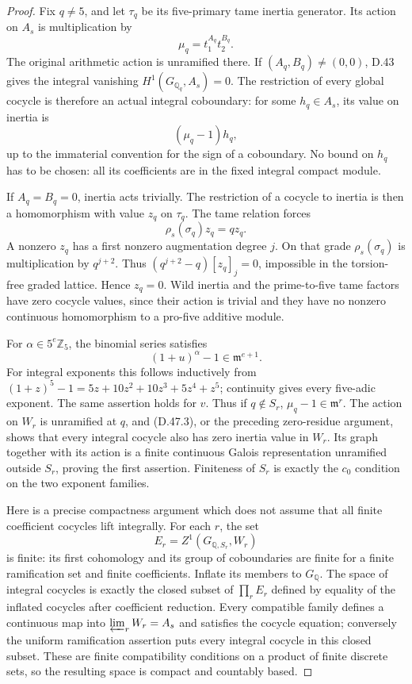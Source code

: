 \begin{proof}
Fix \(q\ne5\), and let \(\tau_q\) be its
five-primary tame inertia generator.
Its action on \(A_s\) is multiplication by
\[
                   \mu_q=t_1^{A_q}t_2^{B_q}.
\]
The original arithmetic action is unramified
there. If \((A_q,B_q)\ne(0,0)\), D.43 gives
the integral vanishing
\(H^1(G_{\mathbb Q_q},A_s)=0\).
The restriction of every global cocycle is
therefore an actual integral coboundary:
for some \(h_q\in A_s\), its value on inertia is
\[
                         (\mu_q-1)h_q,                        \tag{D.47.3}
\]
up to the immaterial convention for the
sign of a coboundary. No bound on \(h_q\)
has to be chosen: all its coefficients
are in the fixed integral compact module.

If \(A_q=B_q=0\), inertia acts trivially.
The restriction of a cocycle to inertia
is then a homomorphism with value \(z_q\)
on \(\tau_q\). The tame relation forces
\[
                  \rho_s(\sigma_q)z_q=qz_q.
\]
A nonzero \(z_q\) has a first nonzero
augmentation degree \(j\). On that grade
\(\rho_s(\sigma_q)\) is multiplication
by \(q^{j+2}\). Thus
\((q^{j+2}-q)[z_q]_j=0\), impossible in
the torsion-free graded lattice. Hence
\(z_q=0\). Wild inertia and the
prime-to-five tame factors have zero
cocycle values, since their action is
trivial and they have no nonzero
continuous homomorphism to a pro-five
additive module.

For \(\alpha\in5^e\mathbb Z_5\), the
binomial series satisfies
\[
                  (1+u)^\alpha-1\in\mathfrak m^{e+1}.
                                                               \tag{D.47.4}
\]
For integral exponents this follows
inductively from
\((1+z)^5-1=5z+10z^2+10z^3+5z^4+z^5\);
continuity gives every five-adic exponent.
The same assertion holds for \(v\).
Thus if \(q\notin S_r\),
\(\mu_q-1\in\mathfrak m^r\).
The action on \(W_r\) is unramified
at \(q\), and (D.47.3), or the preceding
zero-residue argument, shows that every
integral cocycle also has zero inertia
value in \(W_r\). Its graph together
with its action is a finite continuous
Galois representation unramified
outside \(S_r\), proving the first
assertion. Finiteness of \(S_r\)
is exactly the \(c_0\) condition on
the two exponent families.

Here is a precise compactness argument
which does not assume that all finite
coefficient cocycles lift integrally.
For each \(r\), the set
\[
                E_r=Z^1(G_{\mathbb Q,S_r},W_r)
\]
is finite: its first cohomology and
its group of coboundaries are finite
for a finite ramification set and
finite coefficients. Inflate its
members to \(G_{\mathbb Q}\).
The space of integral cocycles is
exactly the closed subset of
\(\prod_rE_r\) defined by equality
of the inflated cocycles after
coefficient reduction. Every
compatible family defines a
continuous map into
\(\varprojlim_r W_r=A_s\) and
satisfies the cocycle equation;
conversely the uniform ramification
assertion puts every integral
cocycle in this closed subset.
These are finite compatibility
conditions on a product of finite
discrete sets, so the resulting
space is compact and countably based.


\end{proof}
